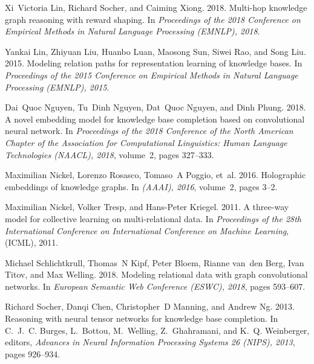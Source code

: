 \documentclass[11pt,a4paper]{article}
\begin{document}
\begin{thebibliography}{29}
Xi~Victoria Lin, Richard Socher, and Caiming Xiong. 2018.
\newblock Multi-hop knowledge graph reasoning with reward shaping.
\newblock In \emph{Proceedings of the 2018 Conference on Empirical Methods in
  Natural Language Processing (EMNLP), 2018}.

Yankai Lin, Zhiyuan Liu, Huanbo Luan, Maosong Sun, Siwei Rao, and Song Liu.
  2015.
\newblock Modeling relation paths for representation learning of knowledge
  bases.
\newblock In \emph{Proceedings of the 2015 Conference on Empirical Methods in
  Natural Language Processing (EMNLP), 2015}.

Dai~Quoc Nguyen, Tu~Dinh Nguyen, Dat~Quoc Nguyen, and Dinh Phung. 2018.
\newblock A novel embedding model for knowledge base completion based on
  convolutional neural network.
\newblock In \emph{Proceedings of the 2018 Conference of the North American
  Chapter of the Association for Computational Linguistics: Human Language
  Technologies (NAACL), 2018}, volume~2, pages 327--333.

Maximilian Nickel, Lorenzo Rosasco, Tomaso~A Poggio, et~al. 2016.
\newblock Holographic embeddings of knowledge graphs.
\newblock In \emph{(AAAI), 2016}, volume~2, pages 3--2.

Maximilian Nickel, Volker Tresp, and Hans-Peter Kriegel. 2011.
\newblock A three-way model for collective learning on multi-relational data.
\newblock In \emph{Proceedings of the 28th International Conference on
  International Conference on Machine Learning}, (ICML), 2011.

Michael Schlichtkrull, Thomas~N Kipf, Peter Bloem, Rianne van~den Berg, Ivan
  Titov, and Max Welling. 2018.
\newblock Modeling relational data with graph convolutional networks.
\newblock In \emph{European Semantic Web Conference (ESWC), 2018}, pages
  593--607.

Richard Socher, Danqi Chen, Christopher~D Manning, and Andrew Ng.
  2013{}.
\newblock Reasoning with neural tensor networks for knowledge base completion.
\newblock In C.~J.~C. Burges, L.~Bottou, M.~Welling, Z.~Ghahramani, and K.~Q.
  Weinberger, editors, \emph{Advances in Neural Information Processing Systems
  26 (NIPS), 2013}, pages 926--934.


\end{thebibliography}
\end{document}
